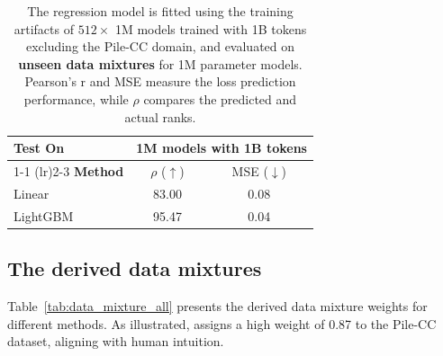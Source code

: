 \begin{table}[htbp]
    \centering
    \small
    \caption{The regression model is fitted using the training artifacts of $512 \times$ 1M models trained with 1B tokens excluding the Pile-CC domain, and evaluated on \textbf{unseen data mixtures} for 1M parameter models. Pearson's r and MSE measure the loss prediction performance, while $\rho$ compares the predicted and actual ranks.}
    \label{tab:linear_vs_lightgbm_1M_OOD}
    \begin{tabular}{lcc}
        \toprule
        {Test On} & \multicolumn{2}{c}{1M models with 1B tokens}\\
        \cmidrule(r){1-1} \cmidrule(lr){2-3}
        \textbf{Method} & $\rho$ ($\uparrow$) & MSE ($\downarrow$) \\
        \midrule
        Linear  & 83.00  & 0.08  \\
        LightGBM & {95.47} & {0.04} \\
        \bottomrule
    \end{tabular}
\end{table}

\subsection{The derived data mixtures}

Table~\ref{tab:data_mixture_all} presents the derived data mixture weights for different methods. As illustrated, \ourmethod assigns a high weight of 0.87 to the Pile-CC dataset, aligning with human intuition.


